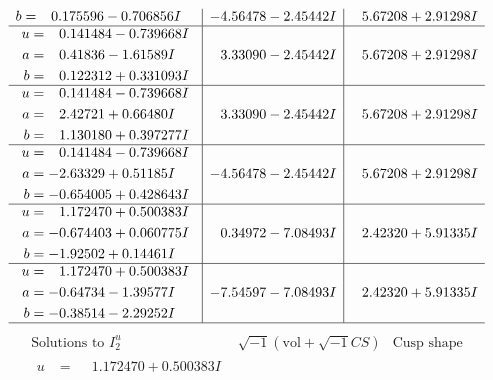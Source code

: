 \documentclass[1p]{elsarticle_modified}
\theoremstyle{definition}
\newcommand{\I}{\sqrt{-1}}
\begin{document}
$$\begin{array}{c|c|c}
\begin{aligned}
b &= \phantom{-}0.175596 - 0.706856 I\end{aligned}
 & -4.56478 - 2.45442 I & \phantom{-}5.67208 + 2.91298 I \\ \hline\begin{aligned}
u &= \phantom{-}0.141484 - 0.739668 I \\
a &= \phantom{-}0.41836 - 1.61589 I \\
b &= \phantom{-}0.122312 + 0.331093 I\end{aligned}
 & \phantom{-}3.33090 - 2.45442 I & \phantom{-}5.67208 + 2.91298 I \\ \hline\begin{aligned}
u &= \phantom{-}0.141484 - 0.739668 I \\
a &= \phantom{-}2.42721 + 0.66480 I \\
b &= \phantom{-}1.130180 + 0.397277 I\end{aligned}
 & \phantom{-}3.33090 - 2.45442 I & \phantom{-}5.67208 + 2.91298 I \\ \hline\begin{aligned}
u &= \phantom{-}0.141484 - 0.739668 I \\
a &= -2.63329 + 0.51185 I \\
b &= -0.654005 + 0.428643 I\end{aligned}
 & -4.56478 - 2.45442 I & \phantom{-}5.67208 + 2.91298 I \\ \hline\begin{aligned}
u &= \phantom{-}1.172470 + 0.500383 I \\
a &= -0.674403 + 0.060775 I \\
b &= -1.92502 + 0.14461 I\end{aligned}
 & \phantom{-}0.34972 - 7.08493 I & \phantom{-}2.42320 + 5.91335 I \\ \hline\begin{aligned}
u &= \phantom{-}1.172470 + 0.500383 I \\
a &= -0.64734 - 1.39577 I \\
b &= -0.38514 - 2.29252 I\end{aligned}
 & -7.54597 - 7.08493 I & \phantom{-}2.42320 + 5.91335 I\\
 \hline 
 \end{array}$$\newpage$$\begin{array}{c|c|c}  
\text{Solutions to }I^u_{2}& \I (\text{vol} + \sqrt{-1}CS) & \text{Cusp shape}\\
 \hline 
\begin{aligned}
u &= \phantom{-}1.172470 + 0.500383 I \\

\end{aligned}
\end{array}$$
\end{document}
